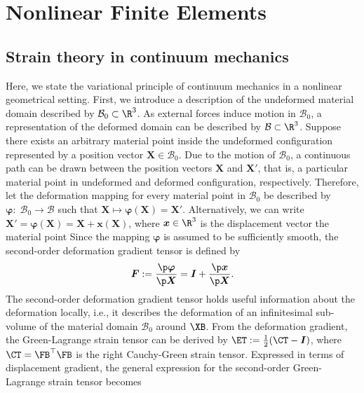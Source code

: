 \section{Nonlinear Finite Elements} \label{chap:fem}

\subsection{Strain theory in continuum mechanics}
Here, we state the variational principle of continuum mechanics in a nonlinear geometrical setting. First, we introduce a description of the undeformed material domain described by $\mathcal{B}_0 \subset \R^3$. As external forces induce motion in $\mathcal{B}_0$, a representation of the deformed domain can be described by $\mathcal{B} \subset \R^3$. Suppose there exists an arbitrary material point inside the undeformed configuration represented by a position vector $\boldsymbol{X} \in \mathcal{B}_0$. Due to the motion of $\mathcal{B}_0$, a continuous path can be drawn between the position vectors $\boldsymbol{X}$ and $\boldsymbol{X}'$, that is, a particular material point in undeformed and deformed configuration, respectively. Therefore, let the deformation mapping for every material point in $\mathcal{B}_0$ be described by $\boldsymbol{\varphi}:\; \mathcal{B}_0 \to \mathcal{B}$ such that $\boldsymbol{X} \mapsto \boldsymbol{\varphi}(\boldsymbol{X}) = \boldsymbol{X}'$. 
Alternatively, we can write $\boldsymbol{X}' = \boldsymbol{\varphi}(\boldsymbol{X}) = \boldsymbol{X} + \boldsymbol{x}(\boldsymbol{X})$, where $\boldsymbol{x} \in \R^3$ is the displacement vector the material point Since the mapping $\boldsymbol{\varphi}$ is assumed to be sufficiently smooth, the second-order deformation gradient tensor is defined by
\begin{equation}
\boldsymbol{F} := \frac{\p \boldsymbol{\varphi} }{\p \boldsymbol{X}} \label{eq:F} = \boldsymbol{I} + \frac{\p \boldsymbol{x} }{\p \boldsymbol{X}}.
\end{equation}
The second-order deformation gradient tensor holds useful information about the deformation locally, i.e., it describes the deformation of an infinitesimal sub-volume of the material domain $\mathcal{B}_0$ around $\XB$. From the deformation gradient, the Green-Lagrange strain tensor can be derived by $\ET : = \frac{1}{2}(\CT - \boldsymbol{I})$, where $\CT = \FB^\top \FB$ is the right Cauchy-Green strain tensor. Expressed in terms of displacement gradient, the general expression for the second-order Green-Lagrange strain tensor becomes
